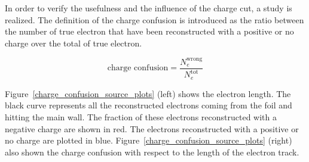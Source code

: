 \documentclass[main.tex]{subfiles}
\begin{document}
\bigskip


\noindent In order to verify the usefulness and the influence of the charge cut, a study is realized. The definition of the charge confusion is introduced as the ratio between the number of true electron that have been reconstructed with a positive or no charge over the total of true electron.


\begin{equation}
\text{charge confusion} = \frac{N_e^{\text{wrong}}}{N_e^{\text{tot}}}
\end{equation}     


\bigskip


\noindent Figure~\ref{charge_confusion_source_plots} (left) shows the electron length. The black curve represents all the reconstructed electrons coming from the foil and hitting the main wall. The fraction of these electrons reconstructed with a negative charge are shown in red. The electrons reconstructed with a positive or no charge are plotted in blue. Figure~\ref{charge_confusion_source_plots} (right) also shown the charge confusion with respect to the length of the electron track. 

\bigskip
\end{document}
